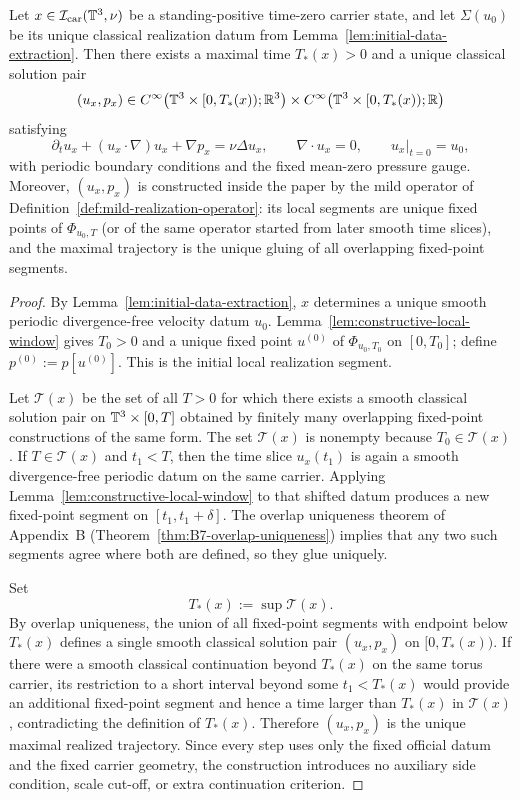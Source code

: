 \begin{theorem}\label{thm:local-classical-realization}
Let $x\in\mathcal I_{\mathrm{car}}(\mathbb{T}^3,\nu)$ be a standing-positive time-zero carrier state, and let
$\Sigma(u_0)$ be its unique classical realization datum from
Lemma~\ref{lem:initial-data-extraction}. Then there exists a maximal time $T_*(x)>0$ and a unique
classical solution pair
\[
(u_x,p_x)\in C^\infty\bigl(\mathbb{T}^3\times[0,T_*(x));\mathbb{R}^3\bigr)\times C^\infty\bigl(\mathbb{T}^3\times[0,T_*(x));\mathbb{R}\bigr)
\]
satisfying
\[
\partial_t u_x + (u_x\cdot\nabla)u_x + \nabla p_x = \nu\Delta u_x,
\qquad \nabla\cdot u_x = 0,
\qquad u_x|_{t=0}=u_0,
\]
with periodic boundary conditions and the fixed mean-zero pressure gauge. Moreover, $(u_x,p_x)$ is
constructed inside the paper by the mild operator of
Definition~\ref{def:mild-realization-operator}: its local segments are unique fixed points of
$\Phi_{u_0,T}$ (or of the same operator started from later smooth time slices), and the maximal
trajectory is the unique gluing of all overlapping fixed-point segments.
\end{theorem}

\begin{proof}
By Lemma~\ref{lem:initial-data-extraction}, $x$ determines a unique smooth periodic divergence-free
velocity datum $u_0$. Lemma~\ref{lem:constructive-local-window} gives $T_0>0$ and a unique fixed
point $u^{(0)}$ of $\Phi_{u_0,T_0}$ on $[0,T_0]$; define $p^{(0)}:=p[u^{(0)}]$. This is the initial
local realization segment.

Let $\mathcal T(x)$ be the set of all $T>0$ for which there exists a smooth classical solution pair on
$\mathbb{T}^3\times[0,T]$ obtained by finitely many overlapping fixed-point constructions of the same form.
The set $\mathcal T(x)$ is nonempty because $T_0\in\mathcal T(x)$. If $T\in\mathcal T(x)$ and
$t_1<T$, then the time slice $u_x(t_1)$ is again a smooth divergence-free periodic datum on the same
carrier. Applying Lemma~\ref{lem:constructive-local-window} to that shifted datum produces a new
fixed-point segment on $[t_1,t_1+\delta]$. The overlap uniqueness theorem of Appendix~B
(Theorem~\ref{thm:B7-overlap-uniqueness}) implies that any two such segments agree where both are
defined, so they glue uniquely.

Set
\[
T_*(x):=\sup \mathcal T(x).
\]
By overlap uniqueness, the union of all fixed-point segments with endpoint below $T_*(x)$ defines a
single smooth classical solution pair $(u_x,p_x)$ on $[0,T_*(x))$. If there were a smooth classical
continuation beyond $T_*(x)$ on the same torus carrier, its restriction to a short interval beyond
some $t_1<T_*(x)$ would provide an additional fixed-point segment and hence a time larger than
$T_*(x)$ in $\mathcal T(x)$, contradicting the definition of $T_*(x)$. Therefore $(u_x,p_x)$ is the
unique maximal realized trajectory. Since every step uses only the fixed official datum and the fixed
carrier geometry, the construction introduces no auxiliary side condition, scale cut-off, or extra
continuation criterion.
\end{proof}

